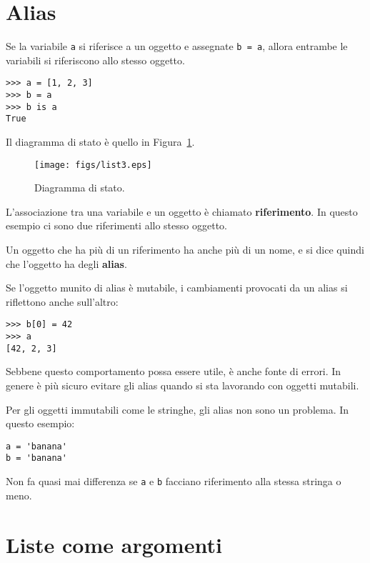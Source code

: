 \documentclass[10pt]{book}
\begin{document}
\section{Alias}

Se la variabile {\tt a} si riferisce a un oggetto e assegnate {\tt b = a},
allora entrambe le variabili si riferiscono allo stesso oggetto.

\begin{verbatim}
>>> a = [1, 2, 3]
>>> b = a
>>> b is a
True
\end{verbatim}
%
Il diagramma di stato è quello in Figura~\ref{fig.list3}.

\begin{figure}
\centerline
{\texttt{[image: figs/list3.eps]}}
\caption{Diagramma di stato.}
\label{fig.list3}
\end{figure}

L'associazione tra una variabile e un oggetto è chiamato {\bf
riferimento}. In questo esempio ci sono due riferimenti allo stesso oggetto.

Un oggetto che ha più di un riferimento ha anche più di un nome, e si dice quindi che l'oggetto ha degli {\bf alias}.

Se l'oggetto munito di alias è mutabile, i cambiamenti provocati da un alias si riflettono anche sull'altro:

\begin{verbatim}
>>> b[0] = 42
>>> a
[42, 2, 3]
\end{verbatim}
%
Sebbene questo comportamento possa essere utile, è anche fonte di errori. In genere è più sicuro evitare gli alias quando si sta lavorando con oggetti mutabili.

Per gli oggetti immutabili come le stringhe, gli alias non sono un problema. In questo esempio:

\begin{verbatim}
a = 'banana'
b = 'banana'
\end{verbatim}
%
Non fa quasi mai differenza se {\tt a} e {\tt b} facciano riferimento alla stessa stringa o meno.


\section{Liste come argomenti}
\label{list.arguments}
\end{document}

